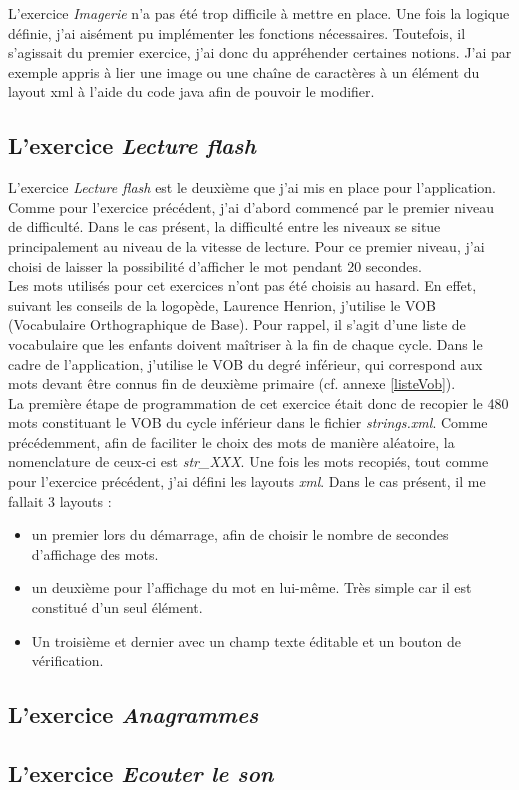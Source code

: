 L'exercice \textit{Imagerie} n'a pas été trop difficile à mettre en place. Une fois la logique définie, j'ai aisément pu implémenter les fonctions nécessaires. Toutefois, il s'agissait du premier exercice, j'ai donc du appréhender certaines notions. J'ai par exemple appris à lier une image ou une chaîne de caractères à un élément du layout xml à l'aide du code java afin de pouvoir le modifier.

\subsection{L'exercice \textit{Lecture flash}}
L'exercice \textit{Lecture flash} est le deuxième que j'ai mis en place pour l'application. Comme pour l'exercice précédent, j'ai d'abord commencé par le premier niveau de difficulté. Dans le cas présent, la difficulté entre les niveaux se situe principalement au niveau de la vitesse de lecture. Pour ce premier niveau, j'ai choisi de laisser la possibilité d'afficher le mot pendant 20 secondes.\\

Les mots utilisés pour cet exercices n'ont pas été choisis au hasard. En effet, suivant les conseils de la logopède, Laurence Henrion, j'utilise le VOB (Vocabulaire Orthographique de Base). Pour rappel, il s'agit d'une liste de vocabulaire que les enfants doivent maîtriser à la fin de chaque cycle. Dans le cadre de l'application, j'utilise le VOB du degré inférieur, qui correspond aux mots devant être connus fin de deuxième primaire (cf. annexe \ref{listeVob}).\\

La première étape de programmation de cet exercice était donc de recopier le 480 mots constituant le VOB du cycle inférieur dans le fichier \textit{strings.xml}. Comme précédemment, afin de faciliter le choix des mots de manière aléatoire, la nomenclature de ceux-ci est \textit{str\_XXX}. Une fois les mots recopiés, tout comme pour l'exercice précédent, j'ai défini les layouts \textit{xml}. Dans le cas présent, il me fallait 3 layouts :
\begin{itemize}
\item un premier lors du démarrage, afin de choisir le nombre de secondes d'affichage des mots.
\item un deuxième pour l'affichage du mot en lui-même. Très simple car il est constitué d'un seul élément.
\item Un troisième et dernier avec un champ texte éditable et un bouton de vérification.
\end{itemize}
	
\subsection{L'exercice \textit{Anagrammes}}


\subsection{L'exercice \textit{Ecouter le son}}


